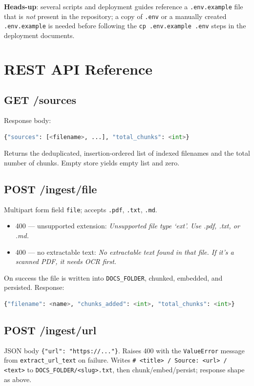 \documentclass[11pt,a4paper]{article}
\newcommand{\code}[1]{\texttt{#1}}
\begin{document}
\textbf{Heads-up}: several scripts and deployment guides reference a
\code{.env.example} file that is \emph{not} present in the repository;
a copy of \code{.env} or a manually created \code{.env.example} is needed
before following the \code{cp .env.example .env} steps in the deployment
documents.

\section{REST API Reference}\label{sec:api-ref}

\subsection{GET /sources}
Response body:
\begin{lstlisting}[language=Python, style=pythonstyle]
{"sources": [<filename>, ...], "total_chunks": <int>}
\end{lstlisting}
Returns the deduplicated, insertion-ordered list of indexed filenames and the
total number of chunks. Empty store yields empty list and zero.

\subsection{POST /ingest/file}
Multipart form field \code{file}; accepts \code{.pdf}, \code{.txt},
\code{.md}.
\begin{itemize}
  \item 400 --- unsupported extension: \emph{Unsupported file type `ext'. Use
        .pdf, .txt, or .md.}
  \item 400 --- no extractable text: \emph{No extractable text found in that
        file. If it's a scanned PDF, it needs OCR first.}
\end{itemize}
On success the file is written into \code{DOCS\_FOLDER}, chunked, embedded,
and persisted. Response:
\begin{lstlisting}[language=Python, style=pythonstyle]
{"filename": <name>, "chunks_added": <int>, "total_chunks": <int>}
\end{lstlisting}

\subsection{POST /ingest/url}
JSON body \code{\{"url": "https://..."\}}. Raises 400 with the
\code{ValueError} message from \code{extract\_url\_text} on failure. Writes
\code{\# <title> / Source: <url> / <text>} to
\code{DOCS\_FOLDER/<slug>.txt}, then chunk/embed/persist; response shape as
above.
\end{document}
